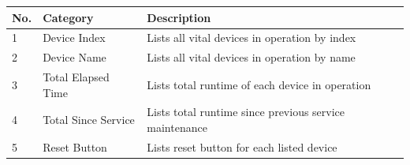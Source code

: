 \begin{longtable}[]{@{}lll@{}}
\toprule
\begin{minipage}[b]{0.04\columnwidth}\raggedright
No.\strut
\end{minipage} & \begin{minipage}[b]{0.23\columnwidth}\raggedright
Category\strut
\end{minipage} & \begin{minipage}[b]{0.65\columnwidth}\raggedright
Description\strut
\end{minipage}\tabularnewline
\midrule
\endhead
\begin{minipage}[t]{0.04\columnwidth}\raggedright
1\strut
\end{minipage} & \begin{minipage}[t]{0.23\columnwidth}\raggedright
Device Index\strut
\end{minipage} & \begin{minipage}[t]{0.65\columnwidth}\raggedright
Lists all vital devices in operation by index\strut
\end{minipage}\tabularnewline
\begin{minipage}[t]{0.04\columnwidth}\raggedright
2\strut
\end{minipage} & \begin{minipage}[t]{0.23\columnwidth}\raggedright
Device Name\strut
\end{minipage} & \begin{minipage}[t]{0.65\columnwidth}\raggedright
Lists all vital devices in operation by name\strut
\end{minipage}\tabularnewline
\begin{minipage}[t]{0.04\columnwidth}\raggedright
3\strut
\end{minipage} & \begin{minipage}[t]{0.23\columnwidth}\raggedright
Total Elapsed Time\strut
\end{minipage} & \begin{minipage}[t]{0.65\columnwidth}\raggedright
Lists total runtime of each device in operation\strut
\end{minipage}\tabularnewline
\begin{minipage}[t]{0.04\columnwidth}\raggedright
4\strut
\end{minipage} & \begin{minipage}[t]{0.23\columnwidth}\raggedright
Total Since Service\strut
\end{minipage} & \begin{minipage}[t]{0.65\columnwidth}\raggedright
Lists total runtime since previous service maintenance\strut
\end{minipage}\tabularnewline
\begin{minipage}[t]{0.04\columnwidth}\raggedright
5\strut
\end{minipage} & \begin{minipage}[t]{0.23\columnwidth}\raggedright
Reset Button\strut
\end{minipage} & \begin{minipage}[t]{0.65\columnwidth}\raggedright
Lists reset button for each listed device\strut
\end{minipage}\tabularnewline
\bottomrule
\end{longtable}

